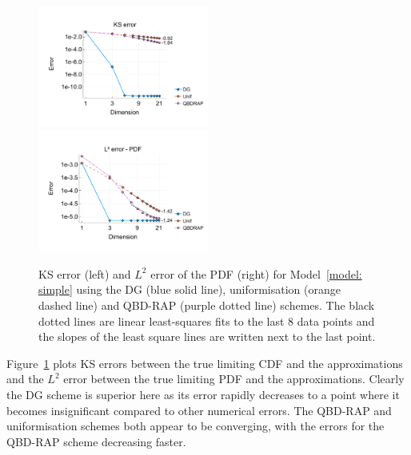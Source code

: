 \begin{figure}[h]
	\centering
	\includegraphics[width=0.5\textwidth,trim={0.75cm 0.8cm 0.25cm 1.25cm},clip]{chapter6/figs/hitting_times_model/reflecting_model/stationary_distribution/ks_error_formatted.pdf}%
	\includegraphics[width=0.5\textwidth,trim={0.75cm 0.8cm 0.25cm 1.25cm},clip]{chapter6/figs/hitting_times_model/reflecting_model/stationary_distribution/l2_pdf_error_formatted.pdf}
	\caption{KS error (left) and \(L^2\) error of the PDF (right) for Model~\ref{model: simple} using the DG (blue solid line), uniformisation (orange dashed line) and QBD-RAP (purple dotted line) schemes. The black dotted lines are linear least-squares fits to the last 8 data points and the slopes of the least square lines are written next to the last point.} 
	\label{fig: reflecting stationary} 
\end{figure}
Figure~\ref{fig: reflecting stationary} plots KS errors between the true limiting CDF and the approximations and the \(L^2\) error between the true limiting PDF and the approximations. Clearly the DG scheme is superior here as its error rapidly decreases to a point where it becomes insignificant compared to other numerical errors. The QBD-RAP and uniformisation schemes both appear to be converging, with the errors for the QBD-RAP scheme decreasing faster.

\FloatBarrier
